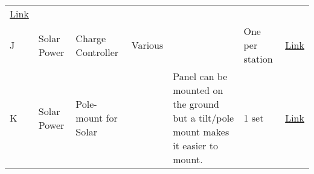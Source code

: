 \documentclass[
]{article}
\begin{document}
\begin{longtable}[]{@{}lllllll@{}}
\begin{minipage}[t]{0.12\columnwidth}
\href{https://www.walmart.com/ip/Everstart-Battery-Marine-12-Volt/868580543}{Link}\strut
\end{minipage}\tabularnewline
\begin{minipage}[t]{0.12\columnwidth}\raggedright
J\strut
\end{minipage} & \begin{minipage}[t]{0.12\columnwidth}\raggedright
Solar Power\strut
\end{minipage} & \begin{minipage}[t]{0.12\columnwidth}\raggedright
Charge Controller\strut
\end{minipage} & \begin{minipage}[t]{0.12\columnwidth}\raggedright
Various\strut
\end{minipage} & \begin{minipage}[t]{0.12\columnwidth}\raggedright
\strut
\end{minipage} & \begin{minipage}[t]{0.12\columnwidth}\raggedright
One per station\strut
\end{minipage} & \begin{minipage}[t]{0.12\columnwidth}\raggedright
\href{https://www.amazon.com/gp/product/B072MMDY4F?pf_rd_p=183f5289-9dc0-416f-942e-e8f213ef368b\&pf_rd_r=Z8QBVS0MGEQFA746ENSH}{Link}\strut
\end{minipage}\tabularnewline
\begin{minipage}[t]{0.12\columnwidth}\raggedright
K\strut
\end{minipage} & \begin{minipage}[t]{0.12\columnwidth}\raggedright
Solar Power\strut
\end{minipage} & \begin{minipage}[t]{0.12\columnwidth}\raggedright
Pole-mount for Solar\strut
\end{minipage} & \begin{minipage}[t]{0.12\columnwidth}\raggedright
\strut
\end{minipage} & \begin{minipage}[t]{0.12\columnwidth}\raggedright
Panel can be mounted on the ground but a tilt/pole mount makes it easier
to mount.\strut
\end{minipage} & \begin{minipage}[t]{0.12\columnwidth}\raggedright
1 set\strut
\end{minipage} & \begin{minipage}[t]{0.12\columnwidth}\raggedright
\href{https://www.amazon.com/WindyNation-Side-Solar-Panel-Mount/dp/B01NAKQMKW/ref=sr_1_4?keywords=solar+panel+pole+mount\&qid=1552483552\&s=lawn-garden\&sr=1-4}{Link}\strut

\end{minipage}
\end{longtable}
\end{document}
